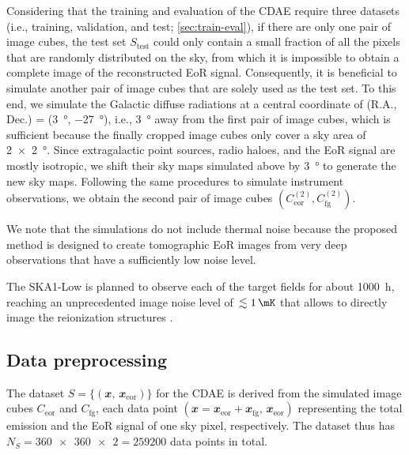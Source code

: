 \documentclass[fleqn,usenatbib]{mnras}
\newcommand{\R}[1]{\mathrm{#1}}
\newcommand{\B}[1]{\mathbfit{#1}}
\newcommand{\editone}[1]{{\leavevmode\color{cyan}#1}}
\newcommand{\edittwo}[1]{{\leavevmode\color{magenta}#1}}
\begin{document}
\editone{%
Considering that the training and evaluation of the CDAE require three
datasets (i.e., training, validation, and test; \autoref{sec:train-eval}),
if there are only one pair of image cubes, the test set $S_{\R{test}}$
could only contain a small fraction of all the pixels that are randomly
distributed on the sky, from which it is impossible to obtain a complete
image of the reconstructed EoR signal.
Consequently, it is beneficial to simulate another pair of image cubes
that are solely used as the test set.
To this end, we simulate the Galactic diffuse radiations at a central
coordinate of (R.A., Dec\@.) = (\SI{3}{\degree}, \SI{-27}{\degree}), i.e.,
\SI{3}{\degree} away from the first pair of image cubes, which is
sufficient because the finally cropped image cubes only cover a sky area of
\SI{2 x 2}{\degree}.
Since extragalactic point sources, radio haloes, and the EoR signal are
mostly isotropic, we shift their sky maps simulated above by
\SI{3}{\degree} to generate the new sky maps.
Following the same procedures to simulate instrument observations, we
obtain the second pair of image cubes
$\left( C_{\R{eor}}^{(2)}, C_{\R{fg}}^{(2)} \right)$.

We note that the simulations do not include thermal noise because the
proposed method is designed to create tomographic EoR images from very deep
observations that have a sufficiently low noise level.} %
\edittwo{The SKA1-Low is planned to observe each of the target fields for
about \SI{1000}{\hour}, reaching an unprecedented image noise level of
$\,\lesssim \SI{1}{\mK}$ that allows to directly image the reionization
structures \citep[e.g.,][]{mellema2013rev,mellema2015,koopmans2015rev}.} %


\subsection{Data preprocessing}
\label{sec:preprocessing}

The dataset $S = \{(\B{x}, \,\B{x}_{\R{eor}})\}$ for the CDAE is derived
from the simulated image cubes $C_{\R{eor}}$ and $C_{\R{fg}}$, each data
point $(\B{x} = \B{x}_{\R{eor}} + \B{x}_{\R{fg}}, \,\B{x}_{\R{eor}})$
representing the total emission and the EoR signal of one sky pixel,
respectively.
\editone{%
The dataset thus has $N_S = \num{360x360 x 2} = \num{259200}$
data points in total.}
\end{document}
